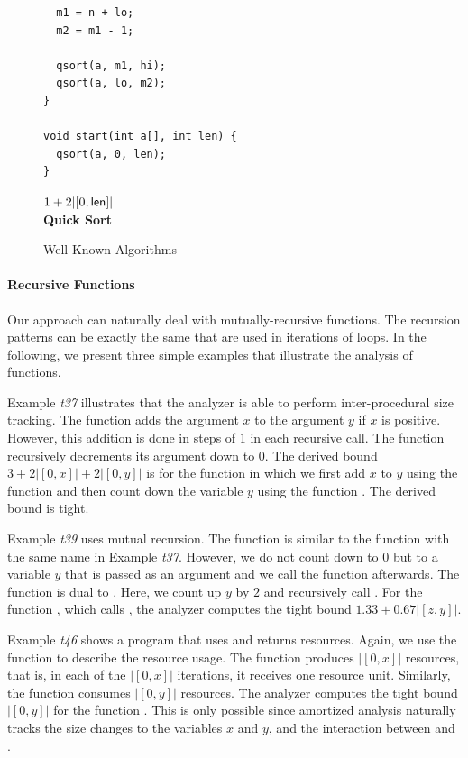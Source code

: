 \documentclass[nocopyrightspace,preprint,pldi]{sigplanconf-pldi15}
\begin{document}
{\begin{figure}
\begin{minipage}[b]{\progwidth}
\begin{center}
\begin{lstlisting}
  m1 = n + lo;
  m2 = m1 - 1;

  qsort(a, m1, hi);
  qsort(a, lo, m2);
}

void start(int a[], int len) {
  qsort(a, 0, len);
}
   \end{lstlisting}

$1 + 2 |[0,\mathsf{len}]|$
\\[.7\baselineskip]
      {\bf Quick Sort}
    \end{center}
  \end{minipage}

   \caption{Well-Known Algorithms}
  \label{fig:wknown}
\end{figure}





\paragraph{Recursive Functions}

Our approach can naturally deal with mutually-recursive functions.
The recursion patterns can be exactly the same that are used in
iterations of loops.  In the following, we present three simple
examples that illustrate the analysis of functions.

Example \emph{t37} illustrates that the analyzer is able to perform
inter-procedural size tracking.  The function  adds the
argument $x$ to the argument $y$ if $x$ is positive.  However, this
addition is done in steps of $1$ in each recursive call.  The function
 recursively decrements its argument down to $0$.
The derived bound $3 + 2|[0, x]| +2|[0, y]|$ is for the function
 in which we first add $x$ to $y$ using the function
 and then count down the variable $y$ using the function
.  The derived bound is tight.

Example \emph{t39} uses mutual recursion.  The function
 is similar to the function with the same name in
Example \emph{t37}.  However, we do not count down to $0$ but to a
variable $y$ that is passed as an argument and we call the function
 afterwards.  The function  is dual to
.  Here, we count up $y$ by $2$ and recursively call
.  For the function , which calls
, the analyzer computes the tight bound $1.33 +
0.67 |[z,y]|$.

Example \emph{t46} shows a program that uses and returns resources.
Again, we use the function  to
describe the resource usage.  The function  produces
$|[0,x]|$ resources, that is, in each of the $|[0,x]|$ iterations, it
receives one resource unit.  Similarly, the function 
consumes $|[0,y]|$ resources.  The analyzer computes the tight bound
$|[0,y]|$ for the function .  This is only possible since
amortized analysis naturally tracks the size changes to the variables
$x$ and $y$, and the interaction between  and
.


}
\end{document}

